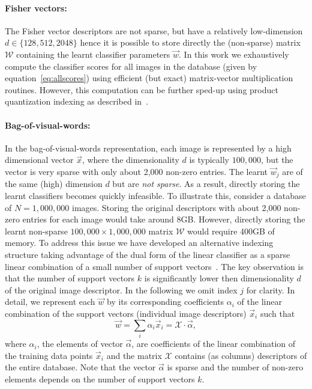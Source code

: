   \paragraph{Fisher vectors:}    
    The Fisher vector descriptors are not sparse, but have a relatively low-dimension $d\in\{128, 512, 2048\}$ hence it is possible to store directly the (non-sparse) matrix $\mathcal{W}$ containing the learnt classifier parameters $\vec{w}$. In this work we exhaustively compute the classifier scores for all images in the database (given by equation~\eqref{eq:allscores}) using efficient (but exact) matrix-vector multiplication routines. However, this computation can be further sped-up using product quantization indexing as described in~\cite{Jegou11}.     

 
  \paragraph{Bag-of-visual-words:}
    In the bag-of-visual-words representation, each image is represented by a high dimensional vector $\vec{x}$, where the dimensionality $d$ is typically $100,000$, but the vector is very sparse with only about 2,000 non-zero entries. 
    The learnt $\vec{w}_j$ are of the same (high) dimension $d$ but are {\em not sparse}. As a result, directly storing the learnt classifiers becomes quickly infeasible.
    To illustrate this, consider a database of $N=1,000,000$ images. Storing the original descriptors with about 2,000 non-zero entries for each image would take around 8GB. However, directly storing the learnt non-sparse $100,000\times 1,000,000 $ matrix $\mathcal{W}$ would require 400GB of memory. %
    To address this issue we have developed an alternative indexing structure taking advantage of the dual form of the linear classifier as a sparse linear combination of a small number of support vectors~\cite{scholkopf2002learning}.   
    The key observation is that the number of support vectors $k$ is significantly lower then dimensionality $d$ of the original image descriptor. In the following we omit index $j$ for clarity.  In detail, we represent each $\vec{w}$ by its corresponding coefficients $\alpha_i$ of the linear combination of the support vectors (individual image descriptors) $\vec{x}_i$ such that
      \begin{equation}
        \vec{w}=\sum_{i} \alpha_i \vec{x}_i = \mathcal{X} \cdot \vec{\alpha},
        \label{eq:dual}
      \end{equation}
      \noindent
    where $\alpha_i$, the elements of vector $\vec{\alpha}$, are coefficients of the linear combination of the training data points $\vec{x}_i$ and the matrix $\mathcal{X}$ contains (as columns) descriptors of the entire database. Note that the vector $\vec{\alpha}$ is sparse and the number of non-zero elements depends on the number of support vectors $k$. 

